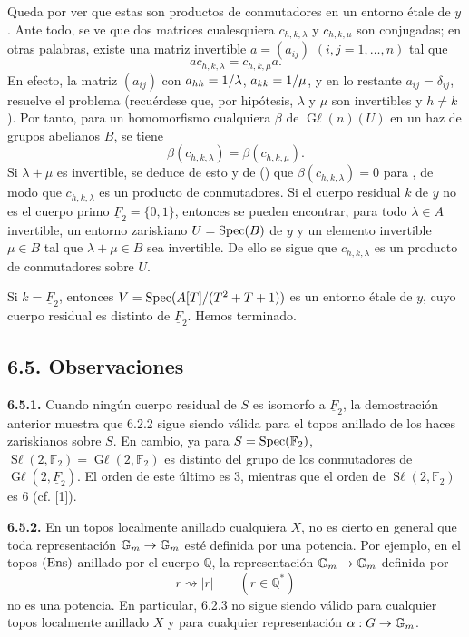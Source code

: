Queda por ver que estas son productos de conmutadores en un entorno étale de
\(y\). Ante todo, se ve que dos matrices cualesquiera
\(c_{h,k,\lambda}\) y \(c_{h,k,\mu}\) son conjugadas; en otras palabras,
existe una matriz invertible \(a=(a_{ij})\)
\((i,j=1,\ldots,n)\) tal que
\[
 ac_{h,k,\lambda}=c_{h,k,\mu}a.
\]
En efecto, la matriz \((a_{ij})\) con \(a_{hh}=1/\lambda\),
\(a_{kk}=1/\mu\), y en lo restante \(a_{ij}=\delta_{ij}\), resuelve el %
problema (recuérdese que, por hipótesis, \(\lambda\) y \(\mu\) son
invertibles y \(h\ne k\)). Por tanto, para un homomorfismo cualquiera
\(\beta\) de \(\operatorname{G\ell}(n)(U)\) en un haz de grupos abelianos
\(B\), se tiene
\[
 \beta(c_{h,k,\lambda})=\beta(c_{h,k,\mu}).
\]
Si \(\lambda+\mu\) es invertible, se deduce de esto y de () que
\(\beta(c_{h,k,\lambda})=0\) para , de modo que %
\(c_{h,k,\lambda}\) es un producto de conmutadores. Si el cuerpo residual
\(k\) de \(y\) no es el cuerpo primo
\(\underline F_2=\{0,1\}\), entonces se pueden encontrar, para todo
\(\lambda\in A\) invertible, un entorno zariskiano \(U=\operatorname{Spec}(B)\) de \(y\)
y un elemento invertible \(\mu\in B\) tal que \(\lambda+\mu\in B\) sea
invertible. De ello se sigue que \(c_{h,k,\lambda}\) es un producto de
conmutadores sobre \(U\).

Si \(k=\underline F_2\), entonces \(V=\operatorname{Spec}(A[T]/(T^2+T+1))\) es un entorno
étale de \(y\), cuyo cuerpo residual es distinto de \(\underline F_2\).
Hemos terminado.

\subsection*{6.5. Observaciones}
\textbf{6.5.1.} Cuando ningún cuerpo residual de \(S\) es isomorfo a
\(\underline F_2\), la demostración anterior muestra que 6.2.2
sigue siendo válida para el topos anillado de los haces zariskianos sobre
\(S\). En cambio, ya para \(S=\operatorname{Spec}(\mathbb F_2)\),
\(\operatorname{S\ell}(2,\mathbb F_2)=\operatorname{G\ell}(2,\mathbb F_2)\)
es distinto del grupo de los conmutadores de
\(\operatorname{G\ell}(2,\underline F_2)\). El orden de este último es \(3\),
mientras que el orden de \(\operatorname{S\ell}(2,\mathbb F_2)\) es \(6\)
(cf. [1]).

\textbf{6.5.2.} En un topos localmente anillado cualquiera \(X\), no es
cierto en general que toda representación \(\mathbb G_m\to\mathbb G_m\) esté definida por
una potencia. Por ejemplo, en el topos \((\operatorname{Ens})\) anillado por el cuerpo
\(\mathbb Q\), la representación \(\mathbb G_m\to\mathbb G_m\) definida por
\[
 r\rightsquigarrow|r|\qquad(r\in\mathbb Q^*)
\]
no es una potencia. En particular, 6.2.3 no sigue siendo válido para
cualquier topos localmente anillado \(X\) y para cualquier representación
\(\alpha:G\to\mathbb G_m\).

